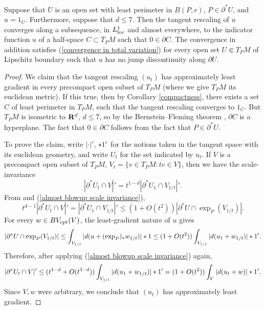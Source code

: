\begin{proposition}\label{blowup theorem}
Suppose that $U$ is an open set with least perimeter in $B(P, r)$, $P \in \partial^* U$, and $u = 1_U$.
Furthermore, suppose that $d \leq 7$.
Then the tangent rescaling of $u$ converges along a subsequence, in $L^1_{\mathrm{loc}}$ and almost everywhere, to the indicator function $u$ of a half-space $C \subset T_PM$ such that $0 \in \partial C$.
The convergence in addition satisfies (\ref{convergence in total variation}) for every open set $U \Subset T_PM$ of Lipschitz boundary such that $u$ has no jump discontinuity along $\partial U$.
\end{proposition}
\begin{proof}
We claim that the tangent rescaling $(u_t)$ has approximately least gradient in every precompact open subset of $T_PM$ (where we give $T_PM$ its euclidean metric). If this true, then by Corollary \ref{compactness}, there exists a set $C$ of least perimeter in $T_PM$, such that the tangent rescaling converges to $1_C$.
But $T_PM$ is isometric to $\mathbf{R}^d$, $d \leq 7$, so by the Bernstein--Fleming theorem \cite[Theorem 17.3]{Giusti77} \cite[\S5]{Fleming62}, $\partial C$ is a hyperplane.
The fact that $0 \in \partial C$ follows from the fact that $P \in \partial^* U$.

To prove the claim, write $|\cdot|'$, $*1'$ for the notions taken in the tangent space with its euclidean geometry, and write $U_t$ for the set indicated by $u_t$.
If $V$ is a precompact open subset of $T_PM$, $V_t = \{v \in T_PM: tv \in V\}$, then we have the scale-invariance
\begin{equation}\label{almost blowup scale invariance}
|\partial^* U_t \cap V|' = t^{1 - d}|\partial^* U_1 \cap V_{1/t}|'.
\end{equation}
From \cite[Lemma 3.4]{schoen1994lectures} and (\ref{almost blowup scale invariance}),
$$t^{d - 1} |\partial^* U_t \cap V|' = |\partial^* U_1 \cap V_{1/t}|' \leq (1 + O(t^2)) |\partial^* U \cap \exp_P(V_{1/t})|.$$
For every $w \in BV_{\mathrm{cpt}}(V)$, the least-gradient nature of $u$ gives
$$|\partial^* U \cap \exp_P(V_{1/t})| \leq \int_{V_{1/t}} |d(u + (\exp_P)_* w_{1/t})| *1 \leq (1 + O(t^2))\int_{V_{1/t}} |d(u_1 + w_{1/t})| *1'.$$
Therefore, after applying (\ref{almost blowup scale invariance}) again,
$$|\partial^* U_t \cap V|' \leq (t^{1 - d} + O(t^{3 - d})) \int_{V_{1/t}} |d(u_1 + w_{1/t})| *1' = (1 + O(t^2)) \int_V |d(u_t + w)| *1'.$$
Since $V,w$ were arbitrary, we conclude that $(u_t)$ has approximately least gradient.
\end{proof}
